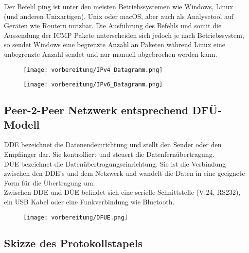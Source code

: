     Der Befehl ping ist unter den meisten Betriebssystemen wie Windows, Linux (und anderen Unixartigen), Unix oder macOS, aber auch als Analysetool auf Geräten wie Routern nutzbar. Die Ausführung des Befehls und somit die Aussendung der ICMP Pakete unterscheiden sich jedoch je nach Betriebssystem, so sendet Windows eine begrenzte Anzahl an Paketen während Linux eine unbegrenzte Anzahl sendet und nur manuell abgebrochen werden kann.

    \begin{figure}[H]
        \centering
        \texttt{[image: vorbereitung/IPv4\_Datagramm.png]}
    \end{figure}
    \begin{figure}[H]
        \centering
        \texttt{[image: vorbereitung/IPv6\_Datagramm.png]}
    \end{figure}




\subsection{Peer-2-Peer Netzwerk entsprechend DFÜ-Modell}

    DDE bezeichnet die Datenendeinrichtung und stellt den Sender oder den Empfänger dar. Sie kontrolliert und steuert die Datenfernübertragung.\\
    DÜE bezeichnet die Datenübertragungseinrichtung. Sie ist die Verbindung zwischen den DDE’s und dem Netzwerk und wandelt die Daten in eine geeignete Form für die Übertragung um.\\
    Zwischen DDE und DÜE befindet sich eine serielle Schnittstelle (V.24, RS232), ein USB Kabel oder eine Funkverbindung wie Bluetooth.\\

    \begin{figure}[H]
        \centering
        \texttt{[image: vorbereitung/DFUE.png]}
    \end{figure}
\subsection{Skizze des Protokollstapels}

